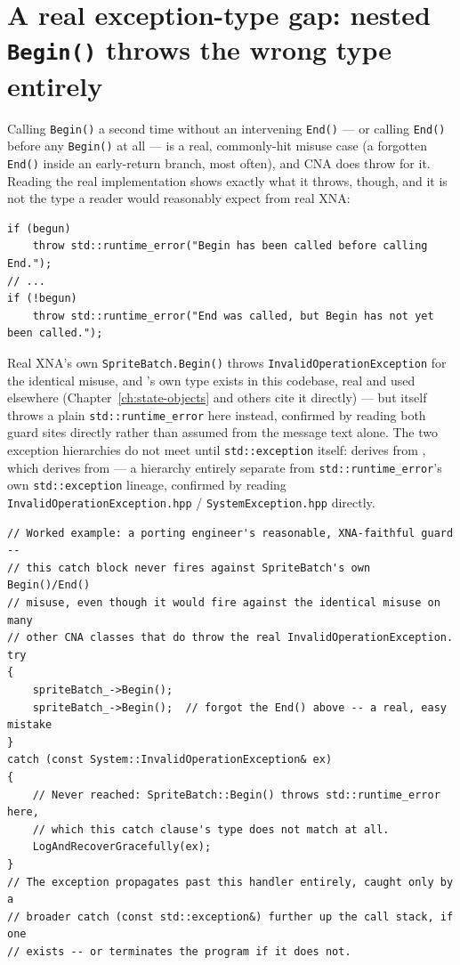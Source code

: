 \section{A real exception-type gap: nested \texttt{Begin()} throws the wrong type entirely}
\label{sec:spritebatch-wrong-exception-type}

Calling \texttt{Begin()} a second time without an intervening \texttt{End()} --- or calling
\texttt{End()} before any \texttt{Begin()} at all --- is a real, commonly-hit misuse case (a
forgotten \texttt{End()} inside an early-return branch, most often), and CNA does throw for it.
Reading the real implementation shows exactly what it throws, though, and it is not the type a
reader would reasonably expect from real XNA:

\begin{lstlisting}
if (begun)
    throw std::runtime_error("Begin has been called before calling End.");
// ...
if (!begun)
    throw std::runtime_error("End was called, but Begin has not yet been called.");
\end{lstlisting}

Real XNA's own \texttt{SpriteBatch.Begin()} throws \texttt{InvalidOperationException} for the
identical misuse, and 's own  type exists in
this codebase, real and used elsewhere (Chapter~\ref{ch:state-objects} and others cite it
directly) --- but  itself throws a plain \texttt{std::runtime\_error}
here instead, confirmed by reading both guard sites directly rather than assumed from the
message text alone. The two exception hierarchies do not meet until \texttt{std::exception}
itself:  derives from , which
derives from  --- a hierarchy entirely separate from
\texttt{std::runtime\_error}'s own \texttt{std::exception} lineage, confirmed by reading
\texttt{InvalidOperationException.hpp} / \texttt{SystemException.hpp} directly.

\begin{lstlisting}
// Worked example: a porting engineer's reasonable, XNA-faithful guard --
// this catch block never fires against SpriteBatch's own Begin()/End()
// misuse, even though it would fire against the identical misuse on many
// other CNA classes that do throw the real InvalidOperationException.
try
{
    spriteBatch_->Begin();
    spriteBatch_->Begin();  // forgot the End() above -- a real, easy mistake
}
catch (const System::InvalidOperationException& ex)
{
    // Never reached: SpriteBatch::Begin() throws std::runtime_error here,
    // which this catch clause's type does not match at all.
    LogAndRecoverGracefully(ex);
}
// The exception propagates past this handler entirely, caught only by a
// broader catch (const std::exception&) further up the call stack, if one
// exists -- or terminates the program if it does not.
\end{lstlisting}

